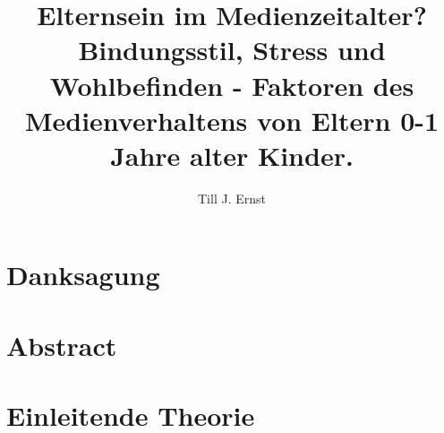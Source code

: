 


\title{Elternsein im Medienzeitalter? \\
Bindungsstil, Stress und Wohlbefinden - Faktoren des Medienverhaltens von Eltern 0-1 Jahre alter Kinder.}
\author{Till J. Ernst}



\makenoidxglossaries %




\section*{Danksagung}\label{sec:Danksagung}

\newpage

\section*{Abstract}\label{sec:Abstract}

\newpage

%




\setcounter{page}{1}
\tableofcontents
\newpage

\listoffigures
\newpage

\listoftables
\newpage

\printnoidxglossary[sort=word, title={Abkürzungsverzeichnis}]%
\newpage

\setcounter{page}{1}

\section{Einleitende Theorie}\label{sec:EinleitendeTheorie}



